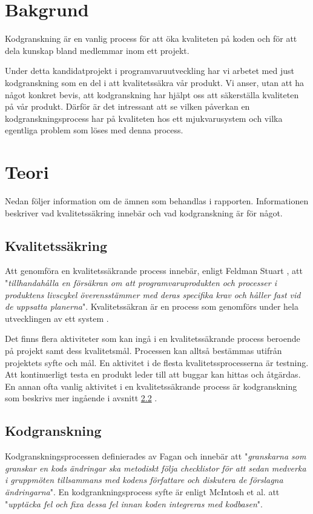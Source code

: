 \section{Bakgrund}
\label{sec:background-wallstrom}

Kodgranskning är en vanlig process för att öka kvaliteten på koden och för att dela kunskap bland medlemmar inom ett projekt.

Under detta kandidatprojekt i programvaruutveckling har vi arbetet med just kodgranskning som en del i att kvalitetssäkra vår produkt. Vi anser, utan att ha något konkret bevis, att kodgranskning har hjälpt oss att säkerställa kvaliteten på vår produkt. Därför är det intressant att se vilken påverkan en kodgranskningsprocess har på kvaliteten hos ett mjukvarusystem och vilka egentliga problem som löses med denna process.

\section{Teori}
\label{sec:theory-wallstrom}
Nedan följer information om de ämnen som behandlas i rapporten. Informationen beskriver vad kvalitetssäkring innebär och vad kodgranskning är för något.

\subsection{Kvalitetssäkring}
Att genomföra en kvalitetssäkrande process innebär, enligt Feldman Stuart \cite{feldman2005quality} , att "\textit{tillhandahålla en försäkran om att programvaruprodukten och processer i produktens livscykel överensstämmer med deras specifika krav och håller fast vid de uppsatta planerna}". 
Kvalitetssäkran är en process som genomförs under hela utvecklingen av ett system \cite{feldman2005quality}.

Det finns flera aktiviteter som kan ingå i en kvalitetssäkrande process beroende på projekt samt dess kvalitetsmål. Processen kan alltså bestämmas utifrån projektets syfte och mål. En aktivitet i de flesta kvalitetssprocesserna är testning. Att kontinuerligt testa en produkt leder till att buggar kan hittas och åtgärdas. En annan ofta vanlig aktivitet i en kvalitetssäkrande process är kodgranskning som beskrivs mer ingående i avsnitt \ref{sec:kodgranskning} \cite{feldman2005quality}.

\subsection{Kodgranskning}
\label{sec:kodgranskning}
Kodgranskningsprocessen definierades av Fagan \cite{fagan1999design} och innebär att "\textit{granskarna som granskar en kods ändringar ska metodiskt följa checklistor för att sedan medverka i gruppmöten tillsammans med kodens författare och diskutera de förslagna ändringarna}". En kodgrankningsprocess syfte är enligt McIntosh et al. \cite{shimagaki2016study} att "\textit{upptäcka fel och fixa dessa fel innan koden integreras med kodbasen}". 

